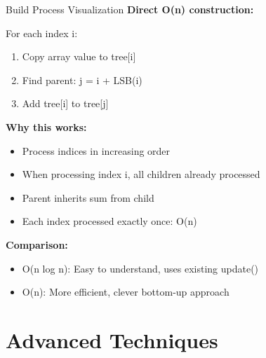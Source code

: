 \documentclass[aspectratio=169]{beamer}
\begin{document}
\begin{frame}{Build Process Visualization}
  \textbf{Direct O(n) construction:}

  \vspace{0.3cm}
  For each index i:
  \begin{enumerate}
    \item Copy array value to tree[i]
    \item Find parent: j = i + LSB(i)
    \item Add tree[i] to tree[j]
  \end{enumerate}

  \vspace{0.5cm}
  \textbf{Why this works:}
  \begin{itemize}
    \item Process indices in increasing order
    \item When processing index i, all children already processed
    \item Parent inherits sum from child
    \item Each index processed exactly once: O(n)
  \end{itemize}

  \vspace{0.5cm}
  \textbf{Comparison:}
  \begin{itemize}
    \item O(n log n): Easy to understand, uses existing update()
    \item O(n): More efficient, clever bottom-up approach
  \end{itemize}
\end{frame}

\section{Advanced Techniques}
\end{document}
